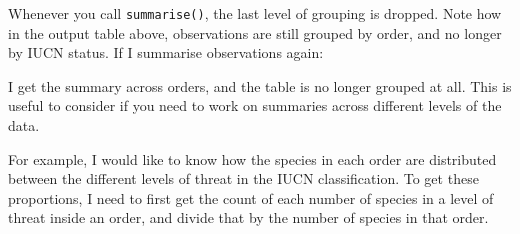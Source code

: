\documentclass[]{book}
\newenvironment{Shaded}{}{}
\newcommand{\CommentTok}[1]{\textcolor[rgb]{0.38,0.63,0.69}{\textit{#1}}}
\newcommand{\KeywordTok}[1]{\textcolor[rgb]{0.00,0.44,0.13}{\textbf{#1}}}
\newcommand{\NormalTok}[1]{#1}
\newcommand{\OperatorTok}[1]{\textcolor[rgb]{0.40,0.40,0.40}{#1}}
\newcommand{\StringTok}[1]{\textcolor[rgb]{0.25,0.44,0.63}{#1}}
\begin{document}
Whenever you call \texttt{summarise()}, the last level of grouping is dropped. Note how in the output table above, observations are still grouped by order, and no longer by IUCN status. If I summarise observations again:

\begin{Shaded}
\end{Shaded}

I get the summary across orders, and the table is no longer grouped at all. This is useful to consider if you need to work on summaries across different levels of the data.

For example, I would like to know how the species in each order are distributed between the different levels of threat in the IUCN classification. To get these proportions, I need to first get the count of each number of species in a level of threat inside an order, and divide that by the number of species in that order.
\end{document}
